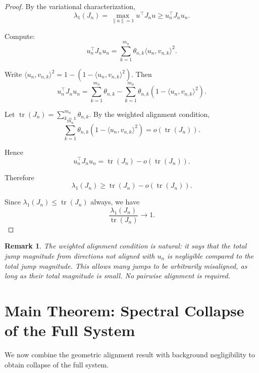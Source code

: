 \documentclass{article}
\newtheorem{remark}{Remark}
\begin{document}
\begin{proof}
By the variational characterization,
\[
\lambda_1(J_n) = \max_{\|u\|=1} u^\top J_n u \ge u_n^\top J_n u_n.
\]

Compute:
\[
u_n^\top J_n u_n = \sum_{k=1}^{m_n} \theta_{n,k} \langle u_n, v_{n,k} \rangle^2.
\]

Write \(\langle u_n, v_{n,k} \rangle^2 = 1 - (1 - \langle u_n, v_{n,k} \rangle^2)\). Then
\[
u_n^\top J_n u_n = \sum_{k=1}^{m_n} \theta_{n,k} - \sum_{k=1}^{m_n} \theta_{n,k} \left(1 - \langle u_n, v_{n,k} \rangle^2\right).
\]

Let \(\operatorname{tr}(J_n) = \sum_{k=1}^{m_n} \theta_{n,k}\). By the weighted alignment condition,
\[
\sum_{k=1}^{m_n} \theta_{n,k} \left(1 - \langle u_n, v_{n,k} \rangle^2\right) = o(\operatorname{tr}(J_n)).
\]

Hence
\[
u_n^\top J_n u_n = \operatorname{tr}(J_n) - o(\operatorname{tr}(J_n)).
\]

Therefore
\[
\lambda_1(J_n) \ge \operatorname{tr}(J_n) - o(\operatorname{tr}(J_n)).
\]

Since \(\lambda_1(J_n) \le \operatorname{tr}(J_n)\) always, we have
\[
\frac{\lambda_1(J_n)}{\operatorname{tr}(J_n)} \to 1.
\]

\end{proof}

\begin{remark}
The weighted alignment condition is natural: it says that the total jump magnitude from directions \emph{not} aligned with \(u_n\) is negligible compared to the total jump magnitude. This allows many jumps to be arbitrarily misaligned, as long as their total magnitude is small. No pairwise alignment is required.
\end{remark}

\section{Main Theorem: Spectral Collapse of the Full System}

We now combine the geometric alignment result with background negligibility to obtain collapse of the full system.
\end{document}
